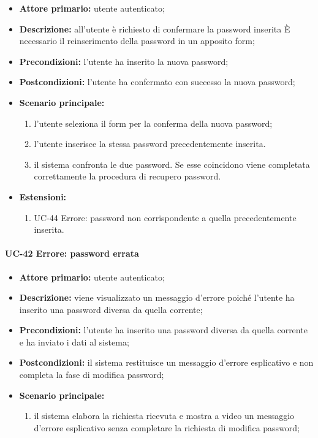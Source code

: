 	\begin{itemize}
		\item \textbf{Attore primario:} utente autenticato;

		\item \textbf{Descrizione:} all'utente è richiesto di confermare la password inserita  \`{E} necessario il reinserimento della password in un apposito form;

		\item \textbf{Precondizioni:} l'utente ha inserito la nuova password;

		\item \textbf{Postcondizioni:} l'utente ha confermato con successo la nuova password;

		\item \textbf{Scenario principale:}
	  		\begin{enumerate}
		  		\item l'utente seleziona il form per la conferma della nuova password;
		  		\item l'utente inserisce la stessa password precedentemente inserita.
		  		\item il sistema confronta le due password. Se esse coincidono viene completata correttamente la procedura di recupero password.
	  		\end{enumerate}
		\item \textbf{Estensioni:}
	  		\begin{enumerate}
		  		\item UC-44 Errore: password non corrispondente a quella precedentemente inserita.
	  		\end{enumerate}
	\end{itemize}

\paragraph{UC-42 Errore: password errata}


	\begin{itemize}
		\item \textbf{Attore primario:} utente autenticato;

		\item \textbf{Descrizione:}  viene visualizzato un messaggio d'errore poiché l'utente ha inserito una password diversa da quella corrente;

		\item \textbf{Precondizioni:} l'utente ha inserito una password diversa da quella corrente e ha inviato i dati al sistema;

		\item \textbf{Postcondizioni:} il sistema restituisce un messaggio d'errore esplicativo e non completa la fase di modifica password;

		\item \textbf{Scenario principale:}
	  		\begin{enumerate}
		  		\item il sistema elabora la richiesta ricevuta e mostra a video un messaggio d'errore esplicativo senza completare la richiesta di modifica password; 
	  		\end{enumerate}
	\end{itemize}

